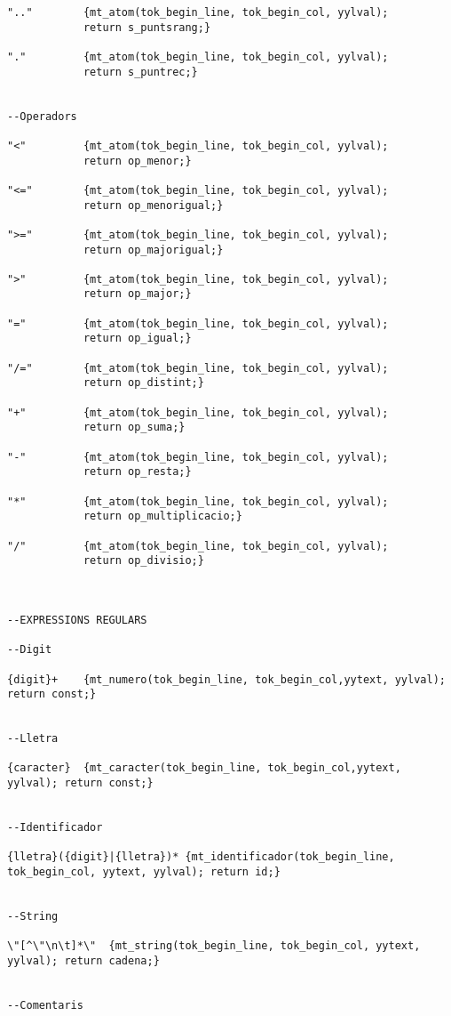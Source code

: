 \documentclass[10pt]{report}
\begin{document}
\begin{lstlisting}[style=Ada]
".."        {mt_atom(tok_begin_line, tok_begin_col, yylval); 
            return s_puntsrang;}
            
"."         {mt_atom(tok_begin_line, tok_begin_col, yylval); 
            return s_puntrec;}


--Operadors

"<"         {mt_atom(tok_begin_line, tok_begin_col, yylval); 
            return op_menor;}

"<="        {mt_atom(tok_begin_line, tok_begin_col, yylval);
            return op_menorigual;}

">="        {mt_atom(tok_begin_line, tok_begin_col, yylval);
            return op_majorigual;}

">"         {mt_atom(tok_begin_line, tok_begin_col, yylval); 
            return op_major;}

"="         {mt_atom(tok_begin_line, tok_begin_col, yylval); 
            return op_igual;}

"/="        {mt_atom(tok_begin_line, tok_begin_col, yylval); 
            return op_distint;}

"+"         {mt_atom(tok_begin_line, tok_begin_col, yylval); 
            return op_suma;}

"-"         {mt_atom(tok_begin_line, tok_begin_col, yylval); 
            return op_resta;}

"*"         {mt_atom(tok_begin_line, tok_begin_col, yylval);
            return op_multiplicacio;}

"/"         {mt_atom(tok_begin_line, tok_begin_col, yylval); 
            return op_divisio;}



--EXPRESSIONS REGULARS

--Digit

{digit}+    {mt_numero(tok_begin_line, tok_begin_col,yytext, yylval); return const;}
            
            
--Lletra

{caracter}  {mt_caracter(tok_begin_line, tok_begin_col,yytext, yylval); return const;}
            

--Identificador

{lletra}({digit}|{lletra})* {mt_identificador(tok_begin_line, tok_begin_col, yytext, yylval); return id;}


--String

\"[^\"\n\t]*\"  {mt_string(tok_begin_line, tok_begin_col, yytext, yylval); return cadena;}


--Comentaris


\end{lstlisting}
\end{document}
